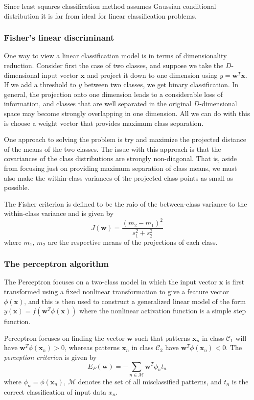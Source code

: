 \documentclass[11pt]{article}
\begin{document}
Since least squares classification method assumes Gaussian conditional
distribution it is far from ideal for linear classification problems.

\subsubsection{Fisher's linear discriminant}
One way to view a linear classification model is in terms of dimensionality
reduction. Consider first the case of two classes, and suppose we take the
$D$-dimensional input vector $\textbf{x}$ and project it down to one dimension
using $y = \textbf{w}^T\textbf{x}$. If we add a threshold to $y$ between two
classes, we get binary classification. In general, the projection onto one
dimension leads to a considerable loss of information, and classes that are
well separated in the original $D$-dimensional space may become strongly
overlapping in one dimension. All we can do with this is choose a weight
vector that provides maximum class separation.

One approach to solving the problem is try and maximize the projected distance
of the means of the two classes. The issue with this approach is that the
covariances of the class distributions are strongly non-diagonal. That is,
aside from focusing just on providing maximum separation of class means, we
must also make the within-class variances of the projected class points as
small as possible.

The Fisher criterion is defined to be the raio of the between-class variance
to the within-class variance and is given by
\begin{equation*}
  J(\textbf{w}) = \frac{(m_2 - m_1)^2}{s_1^2 + s_2^2}
\end{equation*}
  where $m_1$, $m_2$ are the respective means of the projections of each class.
  \subsubsection{The perceptron algorithm}
  The Perceptron focuses on a two-class model in which the input vector
  $\textbf{x}$ is first transformed using a fixed nonlinear transformation to
  give a feature vector $\phi(\textbf{x})$, and this is then used to construct
  a generalized linear model of the form
  $y(\textbf{x}) = f(\textbf{w}^T\phi(\textbf{x}))$ where the nonlinear
  activation function is a simple step function.
  
  Perceptron focuses on finding the vector $\textbf{w}$  such that patterns
  $\textbf{x}_n$ in class $\mathcal{C}_1$ will have
  $\textbf{w}^T\phi(\textbf{x}_n) > 0$, whereas patterns $\textbf{x}_n$ in
  class $\mathcal{C}_2$ have $\textbf{w}^T\phi(\textbf{x}_n) < 0$.
  The \textit{perception criterion} is given by
  \begin{equation*}
    E_P(\textbf{w}) = -\sum_{n \in \mathcal{M}} \textbf{w}^T\phi_n t_n
  \end{equation*}
  where $\phi_n = \phi(\textbf{x}_n)$, $\mathcal{M}$ denotes the set of all
  misclassified patterns, and $t_n$ is the correct classification of input
  data $x_n$.
\end{document}
